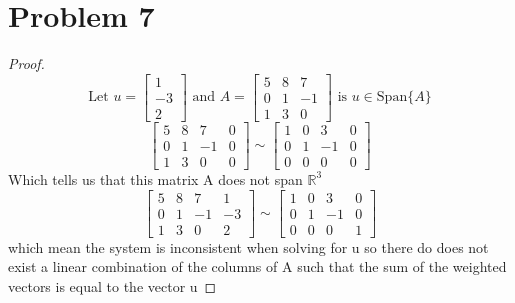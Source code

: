 \documentclass[12pt,a4paper]{article}
\newcommand{\R}{\mathbb{R}}
\begin{document}
\section*{Problem 7}
\begin{proof}
  \[
    \text{Let } u = \begin{bmatrix}
    1\\-3\\2
  \end{bmatrix}\text{ and } A=\begin{bmatrix}
    5 & 8 & 7  \\
    0 & 1 & -1\\ 1 & 3 & 0
\end{bmatrix}
  \text{ is } u \in \text{Span}\{A\}
    \]
    \[
    \begin{bmatrix}
      5 & 8 & 7&0  \\
      0 & 1 & -1&0\\ 1 & 3 & 0&0
    \end{bmatrix}\sim \begin{bmatrix}
      1 & 0 & 3&0  \\
      0 & 1 & -1&0\\ 0 &0 & 0&0
    \end{bmatrix}
    \]
    Which tells us that this matrix A does not span $\R^3$
    $$
    \begin{bmatrix}
      5 & 8 & 7&1  \\
      0 & 1 & -1&-3\\ 1 & 3 & 0&2
    \end{bmatrix}\sim \begin{bmatrix}
      1 & 0 & 3&0  \\
      0 & 1 & -1&0\\ 0 &0 & 0&1
    \end{bmatrix}
    $$
    which mean the system is inconsistent when solving for u so there do does not exist a linear combination of the columns of A such that the sum of the weighted vectors is equal to the vector u
\end{proof}
\end{document}
